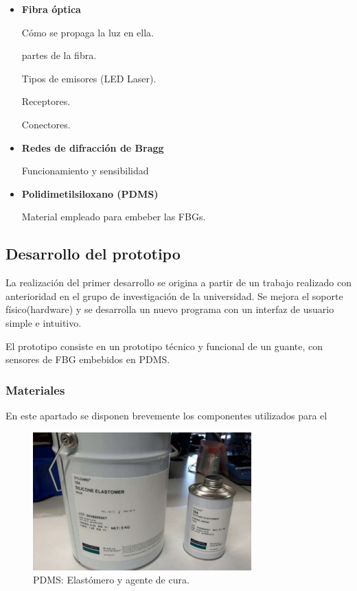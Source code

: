 \begin{itemize}
	\item \textbf{Fibra óptica}
	
	Cómo se propaga la luz en ella.
	
	partes de la fibra.
	
	Tipos de emisores (LED Laser).
	
	Receptores.
	
	Conectores.
	
		\item \textbf{Redes de difracción de Bragg}
		
	Funcionamiento y sensibilidad
		\item \textbf{Polidimetilsiloxano (PDMS)}
		
	Material empleado para embeber las FBGs.
	
		
\end{itemize}
 
\subsection{Desarrollo del prototipo}
\label{sec:prot3FBG}

La realización del primer desarrollo se origina a partir de un trabajo realizado con anterioridad en el grupo de investigación de la universidad\cite{SilviaTFM}. Se mejora el soporte físico(hardware) y se desarrolla un nuevo programa con un interfaz de usuario simple e intuitivo.

El prototipo consiste en un prototipo técnico y funcional de un guante, con sensores de FBG embebidos en PDMS. 
 
\subsubsection{Materiales}
En este apartado se disponen brevemente los componentes utilizados para el 
\begin{figure}[H]
	\centering
	\includegraphics[width=0.75\textwidth]{./img/PDMS}
	\caption{PDMS: Elastómero y agente de cura.} \label{fig:pdms}
\end{figure}



